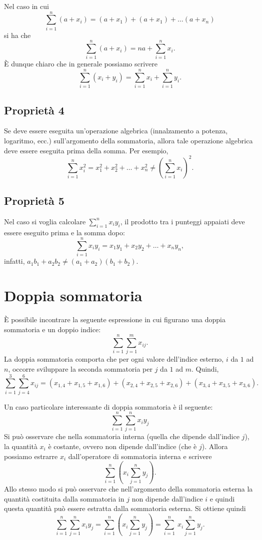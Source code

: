 \documentclass[
]{memoir}
\theoremstyle{definition}
\theoremstyle{definition}
\theoremstyle{definition}
\theoremstyle{definition}
\theoremstyle{remark}
\begin{document}
Nel caso in cui
\[
  \sum_{i=1}^{n} (a + x_i) =  (a + x_1) +  (a + x_1) + \dots  (a + x_n)
  \]
si ha che
\[
  \sum_{i=1}^{n} (a + x_i) =  n a + \sum_{i=1}^{n} x_i.
  \]
È dunque chiaro che in generale possiamo scrivere
\[
  \sum_{i=1}^{n} (x_i + y_i) =  \sum_{i=1}^{n} x_i + \sum_{i=1}^{n} y_i.
  \]

\hypertarget{proprietuxe0-4}{%
\subsection{Proprietà 4}\label{proprietuxe0-4}}

Se deve essere eseguita un'operazione algebrica (innalzamento a potenza, logaritmo, ecc.) sull'argomento della sommatoria, allora tale operazione algebrica deve essere eseguita prima della somma. Per esempio,
\[
\sum_{i=1}^{n} x_i^2 = x_1^2 + x_2^2 + \dots + x_n^2 \neq \left(\sum_{i=1}^{n} x_i \right)^2.
\]

\hypertarget{proprietuxe0-5}{%
\subsection{Proprietà 5}\label{proprietuxe0-5}}

Nel caso si voglia calcolare \(\sum_{i=1}^{n} x_i y_i\), il prodotto tra i punteggi appaiati deve essere eseguito prima e la somma dopo:
\[
\sum_{i=1}^{n} x_i y_i = x_1 y_1 + x_2 y_2 + \dots + x_n y_n,
\]
infatti, \(a_1 b_1 + a_2 b_2 \neq (a_1 + a_2)(b_1 + b_2)\).

\hypertarget{doppia-sommatoria}{%
\section{Doppia sommatoria}\label{doppia-sommatoria}}

È possibile incontrare la seguente espressione in cui figurano una doppia sommatoria e un doppio indice:
\[
\sum_{i=1}^{n}\sum_{j=1}^{m} x_{ij}.
\]
La doppia sommatoria comporta che per ogni valore dell'indice esterno, \(i\) da \(1\) ad \(n\), occorre sviluppare la seconda sommatoria per \(j\) da \(1\) ad \(m\). Quindi,
\[
\sum_{i=1}^{3}\sum_{j=4}^{6} x_{ij} = (x_{1, 4} + x_{1, 5} + x_{1, 6}) + (x_{2, 4} + x_{2, 5} + x_{2, 6}) + (x_{3, 4} + x_{3, 5} + x_{3, 6}).
\]

Un caso particolare interessante di doppia sommatoria è il seguente:
\[
\sum_{i=1}^{n}\sum_{j=1}^{n} x_i y_j
\]
Si può osservare che nella sommatoria interna (quella che dipende dall'indice \(j\)), la quantità \(x_i\) è costante, ovvero non dipende dall'indice (che è \(j\)). Allora possiamo estrarre \(x_i\) dall'operatore di sommatoria interna e scrivere
\[
\sum_{i=1}^{n} \left( x_i \sum_{j=1}^{n} y_j \right).
\]
Allo stesso modo si può osservare che nell'argomento della sommatoria esterna la quantità costituita dalla sommatoria in \(j\) non dipende dall'indice \(i\) e quindi questa quantità può essere estratta dalla sommatoria esterna. Si ottiene quindi
\[
\sum_{i=1}^{n}\sum_{j=1}^{n} x_i y_j = \sum_{i=1}^{n} \left( x_i \sum_{j=1}^{n} y_j \right) = \sum_{i=1}^{n}\ x_i \sum_{j=1}^{n} y_j.
\]
\end{document}
